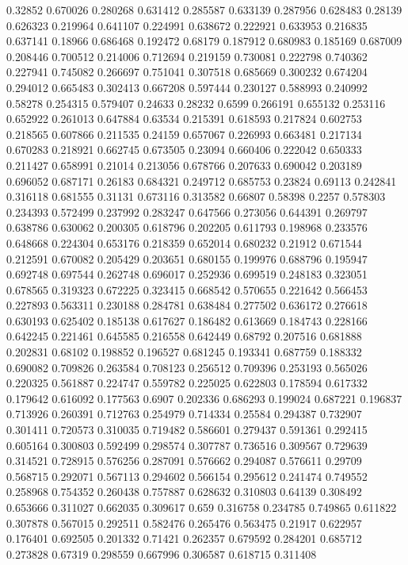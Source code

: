 0.32852 0.670026
0.280268 0.631412
0.285587 0.633139
0.287956 0.628483
0.28139 0.626323
0.219964 0.641107
0.224991 0.638672
0.222921 0.633953
0.216835 0.637141
0.18966 0.686468
0.192472 0.68179
0.187912 0.680983
0.185169 0.687009
0.208446 0.700512
0.214006 0.712694
0.219159 0.730081
0.222798 0.740362
0.227941 0.745082
0.266697 0.751041
0.307518 0.685669
0.300232 0.674204
0.294012 0.665483
0.302413 0.667208
0.597444 0.230127
0.588993 0.240992
0.58278 0.254315
0.579407 0.24633
0.28232 0.6599
0.266191 0.655132
0.253116 0.652922
0.261013 0.647884
0.63534 0.215391
0.618593 0.217824
0.602753 0.218565
0.607866 0.211535
0.24159 0.657067
0.226993 0.663481
0.217134 0.670283
0.218921 0.662745
0.673505 0.23094
0.660406 0.222042
0.650333 0.211427
0.658991 0.21014
0.213056 0.678766
0.207633 0.690042
0.203189 0.696052
0.687171 0.26183
0.684321 0.249712
0.685753 0.23824
0.69113 0.242841
0.316118 0.681555
0.31131 0.673116
0.313582 0.66807
0.58398 0.2257
0.578303 0.234393
0.572499 0.237992
0.283247 0.647566
0.273056 0.644391
0.269797 0.638786
0.630062 0.200305
0.618796 0.202205
0.611793 0.198968
0.233576 0.648668
0.224304 0.653176
0.218359 0.652014
0.680232 0.21912
0.671544 0.212591
0.670082 0.205429
0.203651 0.680155
0.199976 0.688796
0.195947 0.692748
0.697544 0.262748
0.696017 0.252936
0.699519 0.248183
0.323051 0.678565
0.319323 0.672225
0.323415 0.668542
0.570655 0.221642
0.566453 0.227893
0.563311 0.230188
0.284781 0.638484
0.277502 0.636172
0.276618 0.630193
0.625402 0.185138
0.617627 0.186482
0.613669 0.184743
0.228166 0.642245
0.221461 0.645585
0.216558 0.642449
0.68792 0.207516
0.681888 0.202831
0.68102 0.198852
0.196527 0.681245
0.193341 0.687759
0.188332 0.690082
0.709826 0.263584
0.708123 0.256512
0.709396 0.253193
0.565026 0.220325
0.561887 0.224747
0.559782 0.225025
0.622803 0.178594
0.617332 0.179642
0.616092 0.177563
0.6907 0.202336
0.686293 0.199024
0.687221 0.196837
0.713926 0.260391
0.712763 0.254979
0.714334 0.25584
0.294387 0.732907
0.301411 0.720573
0.310035 0.719482
0.586601 0.279437
0.591361 0.292415
0.605164 0.300803
0.592499 0.298574
0.307787 0.736516
0.309567 0.729639
0.314521 0.728915
0.576256 0.287091
0.576662 0.294087
0.576611 0.29709
0.568715 0.292071
0.567113 0.294602
0.566154 0.295612
0.241474 0.749552
0.258968 0.754352
0.260438 0.757887
0.628632 0.310803
0.64139 0.308492
0.653666 0.311027
0.662035 0.309617
0.659 0.316758
0.234785 0.749865
0.611822 0.307878
0.567015 0.292511
0.582476 0.265476
0.563475 0.21917
0.622957 0.176401
0.692505 0.201332
0.71421 0.262357
0.679592 0.284201
0.685712 0.273828
0.67319 0.298559
0.667996 0.306587
0.618715 0.311408
